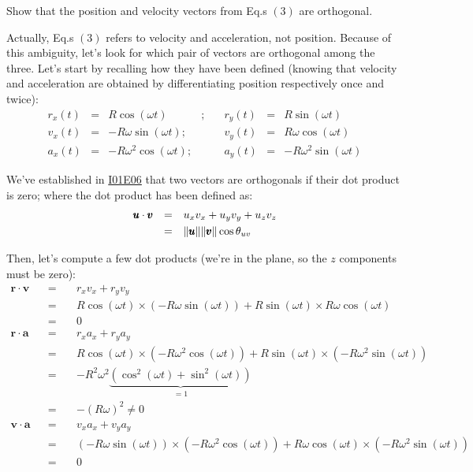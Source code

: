\documentclass[solutions.tex]{subfiles}
\begin{document}
\maketitle
\begin{exercise} Show that the position and velocity
vectors from Eq.s $(3)$ are orthogonal.
\end{exercise}
Actually, Eq.s $(3)$ refers to velocity and acceleration,
not position. Because of this ambiguity, let's look for
which pair of vectors are orthogonal among the three.
Let's start by recalling how they have been defined (knowing
that velocity and acceleration are obtained by differentiating
position respectively once and twice):
\begin{equation*} \begin{aligned}
	r_x(t) &=& R\cos(\omega t)&;\quad& r_y(t) &=& R\sin(\omega t) \\
	v_x(t) &=& -R\omega\sin(\omega t);&\quad& v_y(t) &=& R\omega\cos(\omega t) \\
	a_x(t) &=& -R\omega^2\cos(\omega t);&\quad& a_y(t) &=& -R\omega^2\sin(\omega t)
\end{aligned} \end{equation*}

We've established in
\href{https://github.com/mbivert/ttm/blob/master/cm/I01E06.pdf}{I01E06}
that two vectors are orthogonals if their dot product is zero; where
the dot product has been defined as:
\begin{equation*} \begin{aligned}
	\pmb{u}\cdot\pmb{v} &&=\quad& u_xv_x + u_yv_y + u_zv_z \\
	~ &&=\quad& \lVert \pmb{u} \rVert\lVert \pmb{v} \rVert\cos\theta_{uv}
\end{aligned} \end{equation*}

Then, let's compute a few dot products (we're in the plane, so the
 $z$ components must be zero):
\begin{equation*} \begin{aligned}
	\bm{r}\cdot\bm{v} &&=\quad& r_xv_x + r_yv_y \\
	~ &&=\quad& R\cos(\omega t)\times(-R\omega\sin(\omega t))
		+ R\sin(\omega t)\times R\omega\cos(\omega t) \\
	~ &&=\quad& \boxed{0} \\
	\bm{r}\cdot\bm{a} &&=\quad& r_xa_x + r_ya_y \\
	~ &&=\quad& R\cos(\omega t)\times(-R\omega^2\cos(\omega t))
		+ R\sin(\omega t)\times(-R\omega^2\sin(\omega t)) \\
	~ &&=\quad& -R^2\omega^2\underbrace{
		(\cos^2(\omega t)+\sin^2(\omega t))
	}_{=1} \\
	~ &&=\quad& \boxed{-(R\omega)^2 \neq 0} \\
	\bm{v}\cdot\bm{a} &&=\quad& v_xa_x + v_ya_y \\
	~ &&=\quad& (-R\omega\sin(\omega t))\times(-R\omega^2\cos(\omega t))
		+ R\omega\cos(\omega t)\times(-R\omega^2\sin(\omega t)) \\
	~ &&=\quad& \boxed{0}
\end{aligned} \end{equation*}
\end{document}
